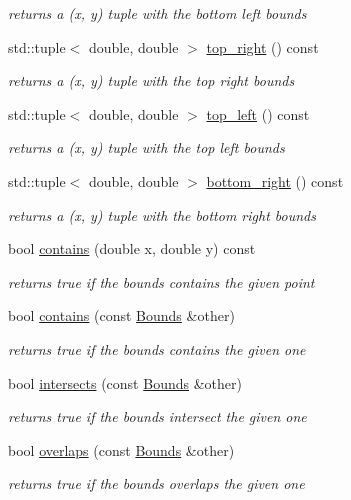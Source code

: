 \begin{DoxyCompactItemize}
\begin{DoxyCompactList}\small\item\em returns a (x, y) tuple with the bottom left bounds \end{DoxyCompactList}\item 
std\-::tuple$<$ double, double $>$ \hyperlink{classsimo_1_1shapes_1_1_bounds_a69d91f8fd16e9b981c7fef47e72055a6}{top\-\_\-right} () const 
\begin{DoxyCompactList}\small\item\em returns a (x, y) tuple with the top right bounds \end{DoxyCompactList}\item 
std\-::tuple$<$ double, double $>$ \hyperlink{classsimo_1_1shapes_1_1_bounds_ac80f194c2c3e1536a6130085c1d5ba70}{top\-\_\-left} () const 
\begin{DoxyCompactList}\small\item\em returns a (x, y) tuple with the top left bounds \end{DoxyCompactList}\item 
std\-::tuple$<$ double, double $>$ \hyperlink{classsimo_1_1shapes_1_1_bounds_ab24c62d2db4062e1a417cd991c717f3b}{bottom\-\_\-right} () const 
\begin{DoxyCompactList}\small\item\em returns a (x, y) tuple with the bottom right bounds \end{DoxyCompactList}\item 
bool \hyperlink{classsimo_1_1shapes_1_1_bounds_a7fbed3478c2d54e90e4c4499787d1dbb}{contains} (double x, double y) const 
\begin{DoxyCompactList}\small\item\em returns true if the bounds contains the given point \end{DoxyCompactList}\item 
bool \hyperlink{classsimo_1_1shapes_1_1_bounds_a7cf9442062faf75f429400474cc3f22f}{contains} (const \hyperlink{classsimo_1_1shapes_1_1_bounds}{Bounds} \&other)
\begin{DoxyCompactList}\small\item\em returns true if the bounds contains the given one \end{DoxyCompactList}\item 
bool \hyperlink{classsimo_1_1shapes_1_1_bounds_a63b1a4874a82b1eeea2ca56eaf2428ae}{intersects} (const \hyperlink{classsimo_1_1shapes_1_1_bounds}{Bounds} \&other)
\begin{DoxyCompactList}\small\item\em returns true if the bounds intersect the given one \end{DoxyCompactList}\item 
bool \hyperlink{classsimo_1_1shapes_1_1_bounds_a0bd0d67f7e4f17328773fe62a048d2e0}{overlaps} (const \hyperlink{classsimo_1_1shapes_1_1_bounds}{Bounds} \&other)
\begin{DoxyCompactList}\small\item\em returns true if the bounds overlaps the given one \end{DoxyCompactList}\end{DoxyCompactItemize}
